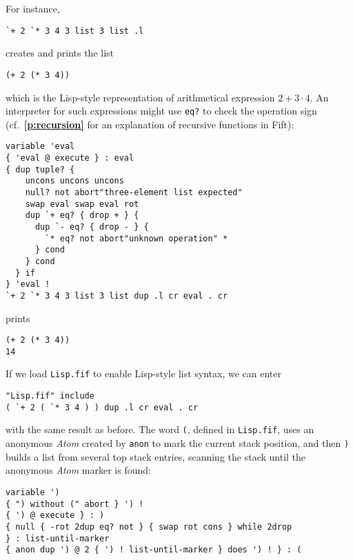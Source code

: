 \documentclass[12pt,oneside]{article}
\def\refpoint#1{{\rm\textbf{\ref{#1}}}}
\let\ptref=\refpoint
\begin{document}
For instance,
\begin{verbatim}
`+ 2 `* 3 4 3 list 3 list .l
\end{verbatim}
creates and prints the list
\begin{verbatim}
(+ 2 (* 3 4))
\end{verbatim}
which is the Lisp-style representation of arithmetical expression $2+3\cdot 4$. An interpreter for such expressions might use {\tt eq?} to check the operation sign (cf.~\ptref{p:recursion} for an explanation of recursive functions in Fift):
\begin{verbatim}
variable 'eval
{ 'eval @ execute } : eval
{ dup tuple? {
    uncons uncons uncons
    null? not abort"three-element list expected"  
    swap eval swap eval rot
    dup `+ eq? { drop + } {
      dup `- eq? { drop - } {
        `* eq? not abort"unknown operation" *   
      } cond
    } cond
  } if 
} 'eval !
`+ 2 `* 3 4 3 list 3 list dup .l cr eval . cr
\end{verbatim}
prints
\begin{verbatim}
(+ 2 (* 3 4)) 
14 
\end{verbatim}
If we load {\tt Lisp.fif} to enable Lisp-style list syntax, we can enter
\begin{verbatim}
"Lisp.fif" include
( `+ 2 ( `* 3 4 ) ) dup .l cr eval . cr
\end{verbatim}
with the same result as before. The word {\tt (}, defined in {\tt Lisp.fif}, uses an anonymous {\em Atom\/} created by {\tt anon} to mark the current stack position, and then {\tt )} builds a list from several top stack entries, scanning the stack until the anonymous {\em Atom\/} marker is found:
\begin{verbatim}
variable ')
{ ") without (" abort } ') ! 
{ ') @ execute } : )
{ null { -rot 2dup eq? not } { swap rot cons } while 2drop
} : list-until-marker
{ anon dup ') @ 2 { ') ! list-until-marker } does ') ! } : (
\end{verbatim}
\end{document}
